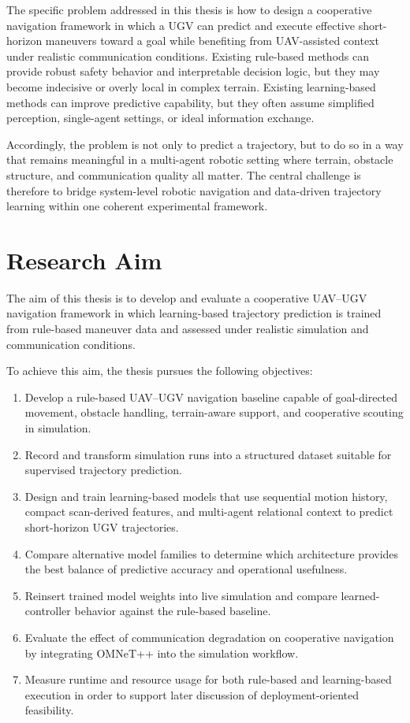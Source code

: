 The specific problem addressed in this thesis is how to design a cooperative navigation framework in which a UGV can predict and execute effective short-horizon maneuvers toward a goal while benefiting from UAV-assisted context under realistic communication conditions. Existing rule-based methods can provide robust safety behavior and interpretable decision logic, but they may become indecisive or overly local in complex terrain. Existing learning-based methods can improve predictive capability, but they often assume simplified perception, single-agent settings, or ideal information exchange.

Accordingly, the problem is not only to predict a trajectory, but to do so in a way that remains meaningful in a multi-agent robotic setting where terrain, obstacle structure, and communication quality all matter. The central challenge is therefore to bridge system-level robotic navigation and data-driven trajectory learning within one coherent experimental framework.

\section{Research Aim}

The aim of this thesis is to develop and evaluate a cooperative UAV--UGV navigation framework in which learning-based trajectory prediction is trained from rule-based maneuver data and assessed under realistic simulation and communication conditions.

To achieve this aim, the thesis pursues the following objectives:

\begin{enumerate}
    \item Develop a rule-based UAV--UGV navigation baseline capable of goal-directed movement, obstacle handling, terrain-aware support, and cooperative scouting in simulation.
    \item Record and transform simulation runs into a structured dataset suitable for supervised trajectory prediction.
    \item Design and train learning-based models that use sequential motion history, compact scan-derived features, and multi-agent relational context to predict short-horizon UGV trajectories.
    \item Compare alternative model families to determine which architecture provides the best balance of predictive accuracy and operational usefulness.
    \item Reinsert trained model weights into live simulation and compare learned-controller behavior against the rule-based baseline.
    \item Evaluate the effect of communication degradation on cooperative navigation by integrating OMNeT++ into the simulation workflow.
    \item Measure runtime and resource usage for both rule-based and learning-based execution in order to support later discussion of deployment-oriented feasibility.
\end{enumerate}

